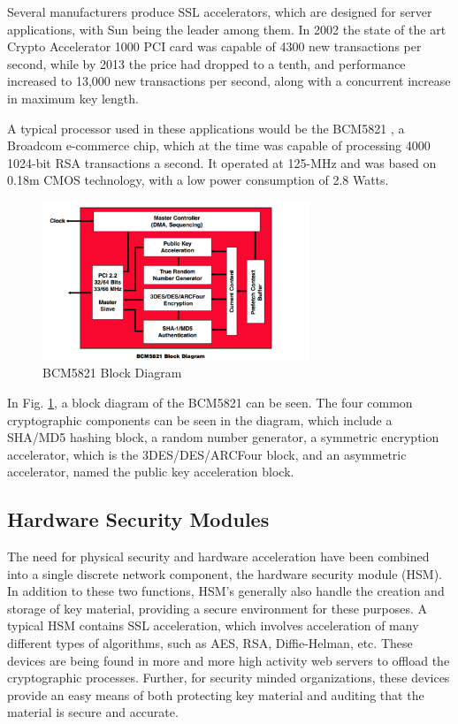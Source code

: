 \documentclass[journal]{IEEEtran}
\begin{document}
Several manufacturers produce SSL accelerators, which are designed for server applications, with Sun being the leader among them.  In 2002 the state of the art Crypto Accelerator 1000 PCI card was capable of 4300 new transactions per second, while by 2013 the price had dropped to a tenth, and performance increased to 13,000 new transactions per second, along with a concurrent increase in maximum key length.

A typical processor used in these applications would be the BCM5821 \cite{broadcom}, a Broadcom e-commerce chip, which at the time was capable of processing 4000 1024-bit RSA transactions a second.  It operated at 125-MHz and was based on 0.18m CMOS technology, with a low power consumption of 2.8 Watts.

\begin{figure}[htbp]
	\centering
	\includegraphics[width=8cm,keepaspectratio]{img/broadcom.png}
	\caption{BCM5821 Block Diagram \cite{broadcom} }
	\label{broadcomFigure}
\end{figure}

In Fig. \ref{broadcomFigure}, a block diagram of the BCM5821 can be seen.  The four common cryptographic components can be seen in the diagram, which include a SHA/MD5 hashing block, a random number generator, a symmetric encryption accelerator, which is the 3DES/DES/ARCFour block, and an asymmetric accelerator, named the public key acceleration block.

\subsection{Hardware Security Modules}

The need for physical security and hardware acceleration have been combined into a single discrete network component, the hardware security module (HSM).  In addition to these two functions, HSM's generally also handle the creation and storage of key material, providing a secure environment for these purposes.  A typical HSM contains SSL acceleration, which involves acceleration of many different types of algorithms, such as AES, RSA, Diffie-Helman, etc.  These devices are being found in more and more high activity web servers to offload the cryptographic processes.  Further, for security minded organizations, these devices provide an easy means of both protecting key material and auditing that the material is secure and accurate.
\end{document}
